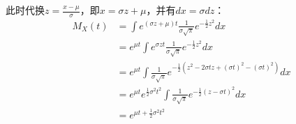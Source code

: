 \documentclass[11pt]{article}
\begin{document}
此时代换$z=\frac{x-\mu}{\sigma}$，即$x= \sigma z + \mu$，并有$dx=\sigma dz$：
\begin{align*}
    M_X(t) &= \int e^{(\sigma z + \mu)t} \frac{1}{\sigma\sqrt{\pi}} e^{-\frac{1}{2}z^2}dx \\
    &= e^{\mu t} \int e^{\sigma z t} \frac{1}{\sigma\sqrt{\pi}} e^{-\frac{1}{2}z^2}dx \\
    &= e^{\mu t} \int \frac{1}{\sigma\sqrt{\pi}} e^{-\frac{1}{2} (z^2 -2\sigma t z + (\sigma t)^2 -(\sigma t)^2)}dx \\
    &= e^{\mu t} e^{\frac{1}{2} \sigma^2 t^2} \int \frac{1}{\sigma\sqrt{\pi}} e^{-\frac{1}{2} (z - \sigma t)^2}dx \\
    &= e^{\mu t + \frac{1}{2} \sigma^2 t^2}
\end{align*}
\end{document}
